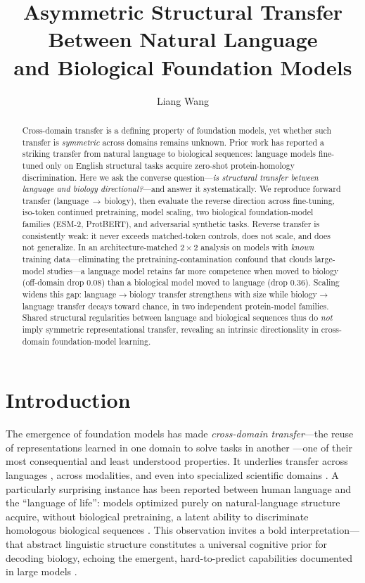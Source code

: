 \documentclass[11pt]{article}
\title{\textbf{Asymmetric Structural Transfer Between Natural Language\\ and Biological Foundation Models}}
\author[1]{Liang Wang}
\affil[1]{School of Artificial Intelligence and Automation, Huazhong University of Science and Technology, Wuhan 430070, P.R. China}
\date{}
\begin{document}
\linenumbers
\maketitle

\begin{abstract}
\noindent
Cross-domain transfer is a defining property of foundation models, yet whether such transfer
is \emph{symmetric} across domains remains unknown. Prior work has reported a striking
transfer from natural language to biological sequences: language models fine-tuned only on
English structural tasks acquire zero-shot protein-homology discrimination. Here we ask the
converse question---\emph{is structural transfer between language and biology directional?}---and
answer it systematically. We reproduce forward transfer (language\,$\rightarrow$\,biology), then
evaluate the reverse direction across fine-tuning, iso-token continued pretraining, model scaling,
two biological foundation-model families (ESM-2, ProtBERT), and adversarial synthetic tasks. Reverse
transfer is consistently weak: it never exceeds matched-token controls, does not scale, and does not
generalize. In an architecture-matched $2{\times}2$ analysis on models with \emph{known} training
data---eliminating the pretraining-contamination confound that clouds large-model studies---a
language model retains far more competence when moved to biology (off-domain drop $0.08$) than a
biological model moved to language (drop $0.36$). Scaling widens this gap: language$\rightarrow$biology
transfer strengthens with size while biology$\rightarrow$language transfer decays toward chance, in
two independent protein-model families. Shared structural regularities between language and
biological sequences thus do \emph{not} imply symmetric representational transfer, revealing an
intrinsic directionality in cross-domain foundation-model learning.
\end{abstract}

\section{Introduction}
The emergence of foundation models \cite{brown2020gpt3,bommasani2021foundation,vaswani2017attention}
has made \emph{cross-domain transfer}---the reuse of
representations learned in one domain to solve tasks in another \cite{pan2010survey,raffel2020t5,neyshabur2020transfer}---one of their most consequential
and least understood properties. It underlies transfer across languages
\cite{artetxe2020cross,conneau2020}, across modalities, and even into specialized scientific domains
\cite{raghu2019transfusion}. A particularly surprising instance has been reported between
human language and the ``language of life'': models optimized purely on natural-language
structure acquire, without biological pretraining, a latent ability to discriminate homologous
biological sequences \cite{searls2002,vig2021,ofer2025}. This observation invites a bold
interpretation---that abstract linguistic structure constitutes a universal cognitive prior for
decoding biology, echoing the emergent, hard-to-predict capabilities documented in large models
\cite{wei2022emergent}.
\end{document}
